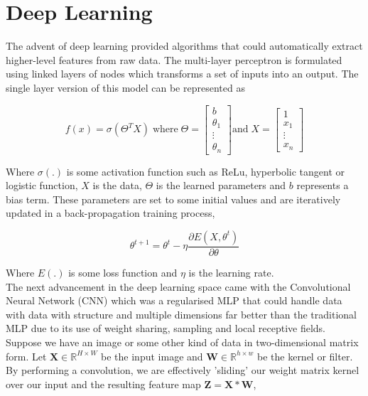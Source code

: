 \documentclass[honours,12pt]{unswthesis}
\numberwithin{equation}{section}
\begin{document}
\section{Deep Learning}\label{dl}
The advent of deep learning provided algorithms that could automatically extract higher-level features from raw data.\cite{deng-deep-learning}
The multi-layer perceptron\cite{rumelhart1986learning} is formulated using linked layers of nodes which transforms a set of inputs into an output.
The single layer version of this model can be represented as

\begin{equation}
    f(x) = \sigma(\Theta^T X)  \; \text{where}  \; \Theta= \begin{bmatrix} b \\ \theta_1 \\ \vdots \\ \theta_n \end{bmatrix} \text{and} \; X = \begin{bmatrix} 1 \\ x_1 \\ \vdots \\ x_n \end{bmatrix}
\end{equation}

\noindent Where $\sigma(.)$ is some activation function such as ReLu, hyperbolic tangent or logistic function, $X$ is the data, $\Theta$ is the learned parameters and $b$ represents a bias term.
These parameters are set to some initial values and are iteratively updated in a back-propagation training process,

\begin{equation}
    \theta^{t+1} = \theta^{t} - \eta\frac{\partial E(X, \theta^t)}{\partial\theta}
\end{equation}

\noindent Where $E(.)$ is some loss function and $\eta$ is the learning rate. \\

\noindent The next advancement in the deep learning space came with the Convolutional Neural Network (CNN) which was a regularised MLP that could
handle data with data with structure and multiple dimensions far better than the traditional MLP due to its use of weight sharing, 
sampling and local receptive fields.\cite{Goodfellow-et-al-2016}
Suppose we have an image or some other kind of data in two-dimensional matrix form. Let $\textbf{X} \in \mathbb{R}^{H\times W}$ be the input image and
$\textbf{W} \in \mathbb{R}^{h\times w}$ be the kernel or filter. By performing a convolution, we are effectively 'sliding' our weight matrix kernel
over our input and the resulting feature map $\textbf{Z} = \textbf{X} \ast \textbf{W}$,
\end{document}
